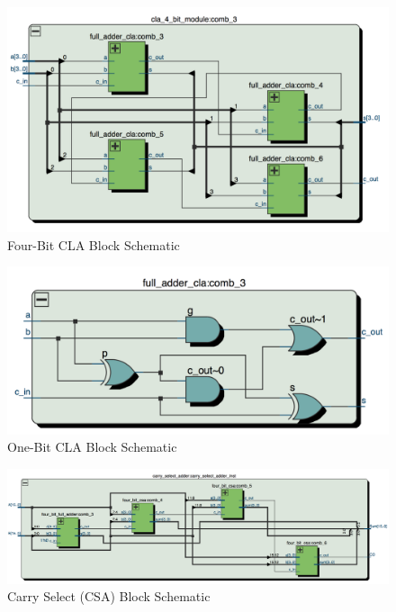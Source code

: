 \documentclass[journal, twocolumn, final,11pt,letterpaper]{IEEEtran}
\begin{document}
\begin{figure} [htbp]
	\centering
	\includegraphics[scale=0.4]{four-bit-cla-block-schematic.png}
	\caption{Four-Bit CLA Block Schematic\label{fig:four-bit-cla-block-schematic}}
\end{figure}

\begin{figure} [htbp]
	\centering
	\includegraphics[scale=0.4]{one-bit-cla-block-schematic.png}
	\caption{One-Bit CLA Block Schematic\label{fig:one-bit-cla-block-schematic}}
\end{figure}


\begin{figure} [htbp]
	\centering
	\includegraphics[scale=0.4]{carry-select-block-schematic.png}
	\caption{Carry Select (CSA) Block Schematic\label{fig:carry-select-block-schematic}}
\end{figure}
\end{document}

